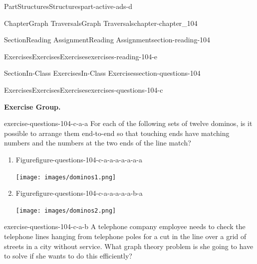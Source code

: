\documentclass[oneside,10pt,]{book}
\numberwithin{equation}{section}
\begin{document}
\begin{partptx}{Part}{Structures}{}{Structures}{}{}{part-active-ads-d}
\begin{chapterptx}{Chapter}{Graph Traversals}{}{Graph Traversals}{}{}{chapter-chapter_104}
\begin{sectionptx}{Section}{Reading Assignment}{}{Reading Assignment}{}{}{section-reading-104}
\begin{exercises-subsection-numberless}{Exercises}{Exercises}{}{Exercises}{}{}{exercises-reading-104-e}
\begin{exercisegroup}
\end{exercisegroup}
\par\medskip\noindent
\end{exercises-subsection-numberless}
\end{sectionptx}
%
%
\typeout{************************************************}
\typeout{************************************************}
%
\begin{sectionptx}{Section}{In-Class Exercises}{}{In-Class Exercises}{}{}{section-questions-104}
%
%
%
\typeout{************************************************}
\typeout{************************************************}
%
\begin{exercises-subsection-numberless}{Exercises}{Exercises}{}{Exercises}{}{}{exercises-questions-104-c}
\par\medskip\noindent%
\textbf{Exercise Group.}\space\space%
\begin{exercisegroup}
\begin{divisionexerciseeg}{1}{}{}{exercise-questions-104-c-a-a}%
For each of the following sets of twelve dominos, is it possible to arrange them end-to-end so that touching ends have matching numbers and the numbers at the two ends of the line match?%
\begin{enumerate}[label=(\alph*)]
\item{}\begin{figureptx}{Figure}{}{figure-questions-104-c-a-a-a-a-a-a-a}{}%
\begin{image}{0}{1}{0}{}%
\texttt{[image: images/dominos1.png]}
\end{image}%
\tcblower
\end{figureptx}%
%
\item{}\begin{figureptx}{Figure}{}{figure-questions-104-c-a-a-a-a-a-b-a}{}%
\begin{image}{0}{1}{0}{}%
\texttt{[image: images/dominos2.png]}
\end{image}%
\tcblower
\end{figureptx}%
%
\end{enumerate}
%
\end{divisionexerciseeg}%
\begin{divisionexerciseeg}{2}{}{}{exercise-questions-104-c-a-b}%
A telephone company employee needs to check the telephone lines hanging from telephone poles for a cut in the line over a grid of streets in a city without service.  What graph theory problem is she going to have to solve if she wants to do this efficiently?%

\end{divisionexerciseeg}
\end{exercisegroup}
\end{exercises-subsection-numberless}
\end{sectionptx}
\end{chapterptx}
\end{partptx}
\end{document}

